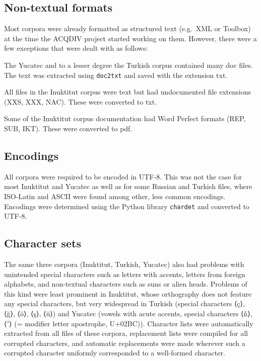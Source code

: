 \documentclass[a4paper, 11pt]{book}
\begin{document}
\subsection{Non-textual formats}
Most corpora were already formatted as structured text (e.g.\ XML or Toolbox) at the time the ACQDIV project started working on them. However, there were a few exceptions that were dealt with as follows: 

\begin{itemize*}
	\item The Yucatec and to a lesser degree the Turkish corpus contained many doc files. The text was extracted using \texttt{doc2txt} and saved with the extension txt. 
	\item All files in the Inuktitut corpus were text but had undocumented file extensions (XXS, XXX, NAC). These were converted to txt. 
	\item Some of the Inuktitut corpus documentation had Word Perfect formats (REP, SUB, IKT). These were converted to pdf. 
\end{itemize*}

\subsection{Encodings}

All corpora were required to be encoded in UTF-8. This was not the case for most Inuktitut and Yucatec as well as for some Russian and Turkish files, where ISO-Latin and ASCII were found among other, less common encodings. Encodings were determined using the Python library \texttt{chardet} and converted to UTF-8.  

\subsection{Character sets}

The same three corpora (Inuktitut, Turkish, Yucatec) also had problems with unintended special characters such as letters with accents, letters from foreign alphabets, and non-textual characters such as suns or alien heads. Problems of this kind were least prominent in Inuktitut, whose orthography does not feature any special characters, but very widespread in Turkish (special characters ⟨ç⟩, ⟨ğ⟩, ⟨ö⟩, ⟨ş⟩, ⟨ü⟩) and Yucatec (vowels with acute accents, special characters ⟨ñ⟩, ⟨ʼ⟩ (= modifier letter apostrophe, U+02BC)). Character lists were automatically extracted from all files of these corpora, replacement lists were compiled for all corrupted characters, and automatic replacements were made wherever such a corrupted character uniformly corresponded to a well-formed character. 
\end{document}
